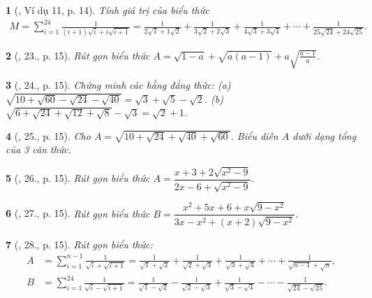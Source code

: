 \documentclass{article}
\newtheorem{baitoan}{}%
\begin{document}
\begin{baitoan}[\cite{Binh_Toan_9_tap_1}, Ví dụ 11, p. 14]
	Tính giá trị của biểu thức
	\begin{align*}
		M = \sum_{i=1}^{24} \frac{1}{(i + 1)\sqrt{i} + i\sqrt{i + 1}} = \frac{1}{2\sqrt{1} + 1\sqrt{2}} + \frac{1}{3\sqrt{2} + 2\sqrt{3}} + \frac{1}{4\sqrt{3} + 3\sqrt{4}} + \cdots + \frac{1}{25\sqrt{24} + 24\sqrt{25}}.
	\end{align*}
\end{baitoan}

\begin{baitoan}[\cite{Binh_Toan_9_tap_1}, 23., p. 15]
	Rút gọn biểu thức $A = \sqrt{1 - a} + \sqrt{a(a - 1)} + a\sqrt{\frac{a - 1}{a}}$.
\end{baitoan}

\begin{baitoan}[\cite{Binh_Toan_9_tap_1}, 24., p. 15]
	Chứng minh các hằng đẳng thức: (a) $\sqrt{10 + \sqrt{60} - \sqrt{24} - \sqrt{40}} = \sqrt{3} + \sqrt{5} - \sqrt{2}$. (b) $\sqrt{6 + \sqrt{24} + \sqrt{12} + \sqrt{8}} - \sqrt{3} = \sqrt{2} + 1$.
\end{baitoan}

\begin{baitoan}[\cite{Binh_Toan_9_tap_1}, 25., p. 15]
	Cho $A = \sqrt{10 + \sqrt{24} + \sqrt{40} + \sqrt{60}}$. Biểu diễn $A$ dưới dạng tổng của 3 căn thức.
\end{baitoan}

\begin{baitoan}[\cite{Binh_Toan_9_tap_1}, 26., p. 15]
	Rút gọn biểu thức $A = \dfrac{x + 3 + 2\sqrt{x^2 - 9}}{2x - 6 + \sqrt{x^2 - 9}}$.
\end{baitoan}

\begin{baitoan}[\cite{Binh_Toan_9_tap_1}, 27., p. 15]
	Rút gọn biểu thức $B = \dfrac{x^2 + 5x + 6 + x\sqrt{9 - x^2}}{3x - x^2 + (x + 2)\sqrt{9 - x^2}}$.
\end{baitoan}

\begin{baitoan}[\cite{Binh_Toan_9_tap_1}, 28., p. 15]
	Rút gọn biểu thức:
	\begin{align*}
		A &= \sum_{i=1}^{n-1} \frac{1}{\sqrt{i} + \sqrt{i + 1}} = \frac{1}{\sqrt{1} + \sqrt{2}} + \frac{1}{\sqrt{2} + \sqrt{3}} + \frac{1}{\sqrt{3} + \sqrt{4}} + \cdots + \frac{1}{\sqrt{n - 1} + \sqrt{n}},\\
		B &= \sum_{i=1}^{24} \frac{1}{\sqrt{i} - \sqrt{i + 1}} = \frac{1}{\sqrt{1} - \sqrt{2}} - \frac{1}{\sqrt{2} - \sqrt{3}} + \frac{1}{\sqrt{3} - \sqrt{4}} - \cdots - \frac{1}{\sqrt{24} - \sqrt{25}}.
	\end{align*}
\end{baitoan}
\end{document}
